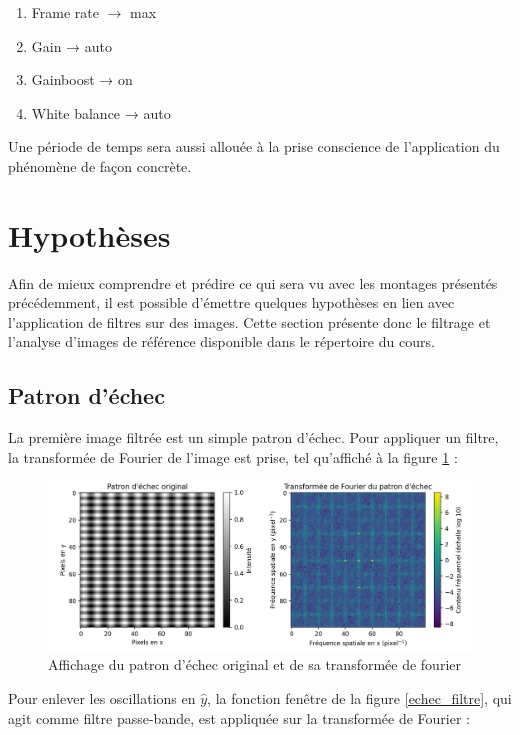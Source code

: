 \documentclass[11pt,letterpaper]{article}
\begin{document}
\begin{enumerate}
    \item Frame rate $\rightarrow$ max\\
    \item Gain → auto \\
    \item Gainboost → on\\
    \item White balance → auto
\end{enumerate}

Une période de temps sera aussi allouée à la prise conscience de l'application du phénomène de façon concrète. 

\section{Hypothèses}

Afin de mieux comprendre et prédire ce qui sera vu avec les montages présentés précédemment, il est possible d'émettre quelques hypothèses en lien avec l'application de filtres sur des images. Cette section présente donc le filtrage et l'analyse d'images de référence disponible dans le répertoire du cours.

\subsection{Patron d'échec}

La première image filtrée est un simple patron d'échec. Pour appliquer un filtre, la transformée de Fourier de l'image est prise, tel qu'affiché à la figure \ref{echec_patron} :

\begin{figure}[H]
  \centering
  \includegraphics[scale=0.68]{check.png}
  \caption{Affichage du patron d'échec original et de sa transformée de fourier}
  \label{echec_patron}
\end{figure}

Pour enlever les oscillations en $\hat{y}$, la fonction fenêtre de la figure \ref{echec_filtre}, qui agit comme filtre passe-bande, est appliquée sur la transformée de Fourier :
\end{document}
